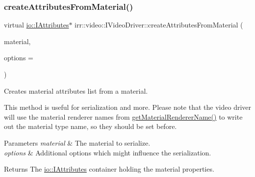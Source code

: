 \subsubsection{\texorpdfstring{create\+Attributes\+From\+Material()}{createAttributesFromMaterial()}\hspace{0.1cm}{\footnotesize\ttfamily [1/2]}}
{\footnotesize\ttfamily virtual \hyperlink{classirr_1_1io_1_1IAttributes}{io\+::\+I\+Attributes}$\ast$ irr\+::video\+::\+I\+Video\+Driver\+::create\+Attributes\+From\+Material (\begin{DoxyParamCaption}\item[{const \hyperlink{classirr_1_1video_1_1SMaterial}{video\+::\+S\+Material} \&}]{material,  }\item[{\hyperlink{structirr_1_1io_1_1SAttributeReadWriteOptions}{io\+::\+S\+Attribute\+Read\+Write\+Options} $\ast$}]{options = {} }\end{DoxyParamCaption})\hspace{0.3cm}{\ttfamily [pure virtual]}}



Creates material attributes list from a material. 

This method is useful for serialization and more. Please note that the video driver will use the material renderer names from \hyperlink{classirr_1_1video_1_1IVideoDriver_ac6f8c53abcd5a24d94c84185b0ef65e0}{get\+Material\+Renderer\+Name()} to write out the material type name, so they should be set before. 
\begin{DoxyParams}{Parameters}
{\em material} & The material to serialize. \\
\hline
{\em options} & Additional options which might influence the serialization. \\
\hline
\end{DoxyParams}
\begin{DoxyReturn}{Returns}
The \hyperlink{classirr_1_1io_1_1IAttributes}{io\+::\+I\+Attributes} container holding the material properties. 
\end{DoxyReturn}
\mbox{\label{classirr_1_1video_1_1IVideoDriver_a4e496fec6b4b0b70d2e95b2576eaffee}} 
